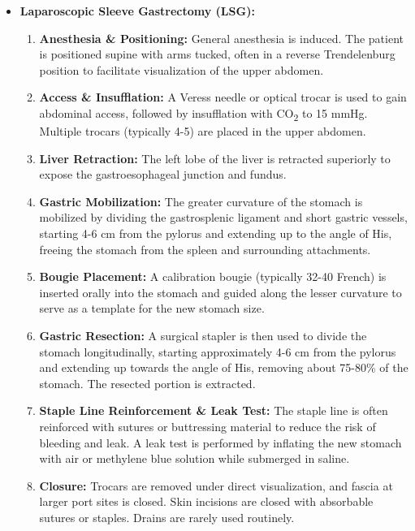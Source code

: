 \begin{itemize}
  \item \textbf{Laparoscopic Sleeve Gastrectomy (LSG):}
    \begin{enumerate}
      \item \textbf{Anesthesia \& Positioning:} General anesthesia is induced. The patient is positioned supine with arms tucked, often in a reverse Trendelenburg position to facilitate visualization of the upper abdomen.
      \item \textbf{Access \& Insufflation:} A Veress needle or optical trocar is used to gain abdominal access, followed by insufflation with CO\textsubscript{2} to 15 mmHg. Multiple trocars (typically 4-5) are placed in the upper abdomen.
      \item \textbf{Liver Retraction:} The left lobe of the liver is retracted superiorly to expose the gastroesophageal junction and fundus.
      \item \textbf{Gastric Mobilization:} The greater curvature of the stomach is mobilized by dividing the gastrosplenic ligament and short gastric vessels, starting 4-6 cm from the pylorus and extending up to the angle of His, freeing the stomach from the spleen and surrounding attachments.
      \item \textbf{Bougie Placement:} A calibration bougie (typically 32-40 French) is inserted orally into the stomach and guided along the lesser curvature to serve as a template for the new stomach size.
      \item \textbf{Gastric Resection:} A surgical stapler is then used to divide the stomach longitudinally, starting approximately 4-6 cm from the pylorus and extending up towards the angle of His, removing about 75-80\% of the stomach. The resected portion is extracted.
      \item \textbf{Staple Line Reinforcement \& Leak Test:} The staple line is often reinforced with sutures or buttressing material to reduce the risk of bleeding and leak. A leak test is performed by inflating the new stomach with air or methylene blue solution while submerged in saline.
      \item \textbf{Closure:} Trocars are removed under direct visualization, and fascia at larger port sites is closed. Skin incisions are closed with absorbable sutures or staples. Drains are rarely used routinely.
    \end{enumerate}


\end{itemize}
